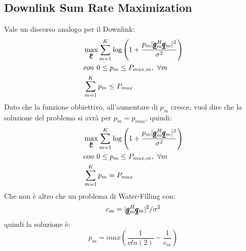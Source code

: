 \subsection{Downlink Sum Rate Maximization}
Vale un discorso analogo per il Downlink:
\begin{equation*}
    \begin{aligned}
    &\max_{\pmb{\underline{p}}} \sum_{m=1}^K \log\left(1 + \frac{p_m |\pmb{\underline{g}}_m^H \pmb{\underline{q}}_m |^2}{\sigma^2} \right) \\
     &con  \ 0 \leq p_m \leq P_{max,m}, \ \forall m \\
     &\sum_{m=1}^K p_m \leq P_{max}
     \end{aligned}
\end{equation*}
Dato che la funzione obbiettivo, all'aumentare di $p_m$ cresce, vuol dire che la soluzione del problema si avrà per $p_m = p_{max}$, quindi:
\begin{equation*}
    \begin{aligned}
    &\max_{\pmb{\underline{p}}} \sum_{m=1}^K \log\left(1 + \frac{p_m |\pmb{\underline{g}}_m^H \pmb{\underline{q}}_m |^2}{\sigma^2} \right) \\
     &con  \ 0 \leq p_m \leq P_{max,m}, \ \forall m \\
     &\sum_{m=1}^K p_m = P_{max}
     \end{aligned}
\end{equation*}
Che non è altro che un problema di Water-Filling con:
\begin{equation*}
     c_m = |\pmb{\underline{g}}_m^H \pmb{\underline{q}}_m |^2 / \sigma^2
\end{equation*}
quindi la soluzione è:
\begin{equation*}
    p_m = max\left(\frac{1}{\nu ln(2)} - \frac{1}{c_m}\right)
\end{equation*}

